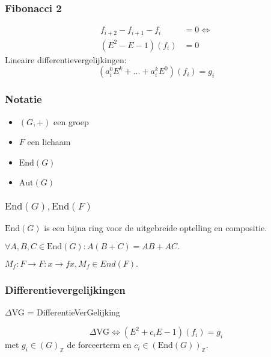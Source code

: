 \documentclass[20pt]{beamer}
\begin{document}
\begin{frame}
    \frametitle{Fibonacci 2}
    \vspace*{-2cm}

    \begin{align*}
        f_{i+2} - f_{i+1} - f_{i} & = 0 \Leftrightarrow \\
        (E^2-E-1)(f_i)            & =0
    \end{align*}
    \pause
    Lineaire differentievergelijkingen:
    $$(a^0_iE^k + ... + a^k_i E^0)(f_i) = g_i$$

\end{frame}

\begin{frame}
    \frametitle{Notatie}
    \begin{notation}
        \begin{itemize}
            \item  $(G,+)$ een groep
            \item  $F$ een lichaam
            \item  $\text{End}(G)$
            \item  $\text{Aut}(G)$
        \end{itemize}
    \end{notation}
\end{frame}

\begin{frame}
    \frametitle{$\text{End}(G),\text{End}(F)$}
    \begin{theorem}
        $\text{End}(G)$ is een bijna ring voor de uitgebreide optelling en compositie.
    \end{theorem}
    \pause
    \begin{theorem}
        $\forall A,B,C \in \text{End}(G): A(B+C) = AB + AC.$
    \end{theorem}
    \pause
    $M_f: F \rightarrow F : x \rightarrow fx, M_f \in End(F).$
\end{frame}

\begin{frame}
    \frametitle{Differentievergelijkingen}
    $\Delta$VG = DifferentieVerGelijking \pause
    \begin{definition}[$\Delta$VG]
        $$
            \Delta\text{VG} \Leftrightarrow (E^2 + c_i E -1)(f_i) = g_i
        $$
        met $g_i \in (G)_{\mathbb{Z}}$ de forceerterm en $c_i \in (\text{End}(G))_{\mathbb{Z}}.$
    \end{definition}
\end{frame}
\end{document}
